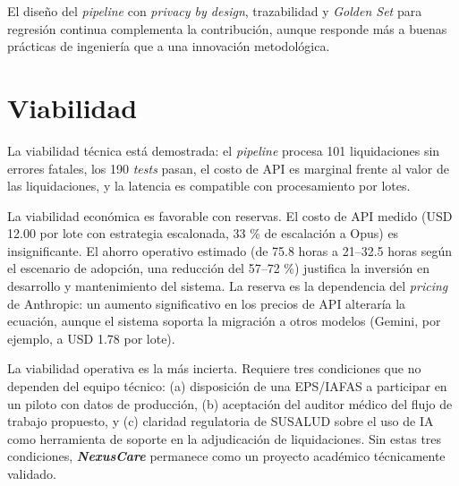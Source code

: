 El diseño del \textit{pipeline} con \textit{privacy by design}, trazabilidad y \textit{Golden Set} para regresión continua complementa la contribución, aunque responde más a buenas prácticas de ingeniería que a una innovación metodológica.

\section{Viabilidad}

La viabilidad técnica está demostrada: el \textit{pipeline} procesa 101 liquidaciones sin errores fatales, los 190 \textit{tests} pasan, el costo de API es marginal frente al valor de las liquidaciones, y la latencia es compatible con procesamiento por lotes.

La viabilidad económica es favorable con reservas. El costo de API medido (USD 12.00 por lote con estrategia escalonada, 33 \% de escalación a Opus) es insignificante. El ahorro operativo estimado (de 75.8 horas a 21–32.5 horas según el escenario de adopción, una reducción del 57–72 \%) justifica la inversión en desarrollo y mantenimiento del sistema. La reserva es la dependencia del \textit{pricing} de Anthropic: un aumento significativo en los precios de API alteraría la ecuación, aunque el sistema soporta la migración a otros modelos (Gemini, por ejemplo, a USD 1.78 por lote).

La viabilidad operativa es la más incierta. Requiere tres condiciones que no dependen del equipo técnico: (a) disposición de una EPS/IAFAS a participar en un piloto con datos de producción, (b) aceptación del auditor médico del flujo de trabajo propuesto, y (c) claridad regulatoria de SUSALUD sobre el uso de IA como herramienta de soporte en la adjudicación de liquidaciones. Sin estas tres condiciones, \textbf{\textit{NexusCare}} permanece como un proyecto académico técnicamente validado.
